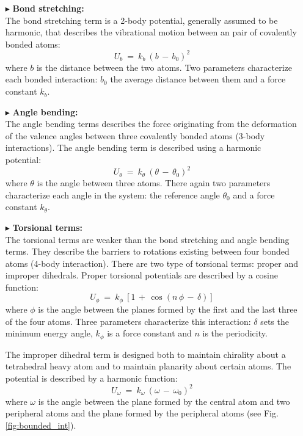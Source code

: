 \begin{itemize}
\item[$\blacktriangleright$] \textbf{Bond stretching:}\\
The bond stretching term is a 2-body potential, generally assumed to be harmonic, that describes the vibrational motion between an pair of covalently bonded atoms:
\begin{equation}\label{eq:poten-bond_int}
U_b \: = \: k_b \: (b \,-\, b_0)^2
\end{equation}
where $b$ is the distance between the two atoms. Two parameters characterize each bonded
interaction: $b_0$ the average distance between them and a force constant $k_b$.

\item[$\blacktriangleright$] \textbf{Angle bending:}\\
The angle bending terms describes the force originating from the deformation of the valence angles between three covalently bonded atoms (3-body interactions). The angle bending term is described using a harmonic potential:
\begin{equation}\label{eq:poten-angle_int}
U_\theta \: = \: k_\theta \: (\theta \,-\, \theta_0)^2
\end{equation}
where $\theta$ is the angle between three atoms. There again two parameters characterize each
angle in the system: the reference angle $\theta_0$ and a force constant $k_\theta$. \\

\item[$\blacktriangleright$] \textbf{Torsional terms:}\\
The torsional terms are weaker than the bond stretching and angle bending terms. They describe the barriers to rotations existing between four bonded atoms (4-body interaction). There are two type of torsional terms: proper and improper dihedrals. Proper torsional potentials are described by a cosine function:
\begin{equation}\label{eq:poten-dihedral_int}
U_\phi \: = \: k_\phi \: [1 \, + \, \cos (n \, \phi \,-\, \delta)]
\end{equation}
where $\phi$ is the angle between the planes formed by the first and the last three of the four atoms. Three parameters characterize this interaction: $\delta$ sets the minimum energy angle, $k_\phi$ is a force constant and $n$ is the periodicity.

The improper dihedral term is designed both to maintain chirality about a tetrahedral heavy atom and to maintain planarity about certain atoms. The potential is described by a harmonic function:
\begin{equation}\label{eq:poten-imp_dihedral_int}
U_\omega \: = \: k_\omega \: (\omega \,-\, \omega_0)^2
\end{equation}
where $\omega$ is the angle between the plane formed by the central atom and two peripheral atoms and the plane formed by the peripheral atoms (see Fig. \ref{fig:bounded_int}).
\end{itemize}

